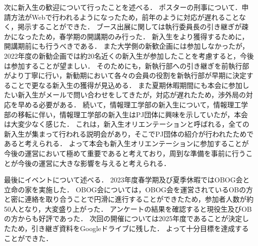 次に新入生の歓迎について行ったことを述べる．
ポスターの刑事について．申請方法がWebで行われるようになったため，前年のように対応が遅れることなく，掲示することができた．
ブース出展に関しては執行委員長の引き継ぎが疎かになったため，春学期の開講期のみ行った．
新入生をより獲得するために，開講期前にも行うべきである．
また大学側の新歓企画には参加しなかったが，2022年度の新勧企画では約20名近くの新入生が参加したことを考慮すると，今後は参加することが望ましい．
そのためにも，新執行部への引き継ぎを前執行部がより丁寧に行い，新勧期において各々の会員の役割を新執行部が早期に決定することで更なる新入生の獲得が見込める．
また夏期休暇期間にも本会に参加したい新入生がメールで問い合わせをしてきたが，対応が遅れたため，渉外局の対応を早める必要がある．
続いて，情報理工学部の新入生について，情報理工学部の移転に伴い，情報理工学部の新入生はPJ団体に興味を示していたが，本会は大変少なく感じた．
これは，新入生オリエンテーションと呼ばれる，全ての新入生が集まって行われる説明会があり，そこでPJ団体の紹介が行われたためであると考えられる．
よって本会も新入生オリエンテーションに参加することが今後の運営において極めて重要であると考えており，周到な準備を事前に行うことが今後の運営に大きな影響を与えると考えられる．

最後にイベントについて述べる．
2023年度春学期及び夏季休暇ではOBOG会と立命の家を実施した．
OBOG会については，OBOG会を運営されているOBの方と密に連絡を取り合うことで円滑に進行することができたため，参加者人数が約50人となり，大変盛り上がった．
アンケートの結果を確認すると現役生及びOBの方からも好評であった．
次回の開催については2025年度であることが決定したため，引き継ぎ資料をGoogleドライブに残した．
よって十分目標を達成することができた．
